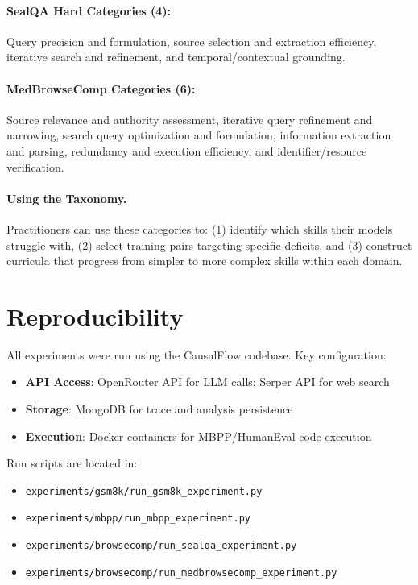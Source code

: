 \documentclass{article}
\theoremstyle{plain}
\theoremstyle{definition}
\theoremstyle{remark}
\begin{document}
\paragraph{SealQA Hard Categories (4):}
Query precision and formulation, source selection and extraction efficiency, iterative search and refinement, and temporal/contextual grounding.

\paragraph{MedBrowseComp Categories (6):}
Source relevance and authority assessment, iterative query refinement and narrowing, search query optimization and formulation, information extraction and parsing, redundancy and execution efficiency, and identifier/resource verification.

\paragraph{Using the Taxonomy.} Practitioners can use these categories to: (1) identify which skills their models struggle with, (2) select training pairs targeting specific deficits, and (3) construct curricula that progress from simpler to more complex skills within each domain.


\section{Reproducibility}

All experiments were run using the CausalFlow codebase. Key configuration:

\begin{itemize}
    \item \textbf{API Access}: OpenRouter API for LLM calls; Serper API for web search
    \item \textbf{Storage}: MongoDB for trace and analysis persistence
    \item \textbf{Execution}: Docker containers for MBPP/HumanEval code execution
\end{itemize}

Run scripts are located in:
\begin{itemize}
    \item \texttt{experiments/gsm8k/run\_gsm8k\_experiment.py}
    \item \texttt{experiments/mbpp/run\_mbpp\_experiment.py}
    \item \texttt{experiments/browsecomp/run\_sealqa\_experiment.py}
    \item \texttt{experiments/browsecomp/run\_medbrowsecomp\_experiment.py}
\end{itemize}
\end{document}
